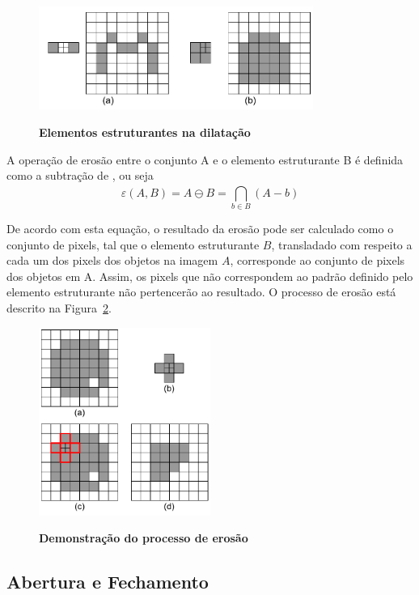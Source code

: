 \documentclass[12pt,oneside,a4paper,english,french,spanish,brazil,]{abntex2}
\begin{document}
\begin{figure}[ht]
\centering
\caption{\textbf{Elementos estruturantes na dilatação}}
\includegraphics[width=0.8\textwidth]{imagens/PDI_Dilatacao_2.pdf}
\sourceAuthor
\label{fig:PDI_Dilatacao_2}
\end{figure}

A operação de erosão entre o conjunto A e o elemento estruturante B é definida como a subtração de \citet{minkowski:1911}, ou seja \[\varepsilon(A,B)=A\ominus B=\bigcap_{b\in B}^{ } (A-b)\]

De acordo com esta equação, o resultado da erosão pode ser calculado como o conjunto de pixels, tal que o elemento estruturante \(B\), transladado com respeito a cada um dos pixels dos objetos na imagem \(A\), corresponde ao conjunto de pixels dos objetos em A. Assim, os pixels que não correspondem ao padrão definido pelo elemento estruturante não pertencerão ao resultado. O processo de erosão está descrito na Figura~\ref{fig:PDI_Erosao_1}.

\begin{figure}[ht]
\centering
\caption{\textbf{Demonstração do processo de erosão}}
\includegraphics[width=0.5\textwidth]{imagens/PDI_Erosao_1.pdf}
\sourceAuthor
\label{fig:PDI_Erosao_1}
\end{figure}

\subsection{Abertura e Fechamento}
\end{document}
